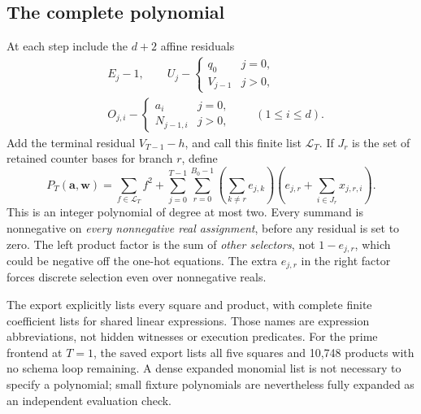 \documentclass[11pt,letterpaper]{article}
\theoremstyle{definition}
\theoremstyle{remark}
\newcommand{\N}{\mathbb N}
\begin{document}
\subsection{The complete polynomial}
At each step include the $d+2$ affine residuals
\begin{align*}
 &E_j-1,\qquad U_j-\begin{cases}q_0&j=0,\\V_{j-1}&j>0,\end{cases}\\
 &O_{j,i}-\begin{cases}a_i&j=0,\\N_{j-1,i}&j>0,\end{cases}
 \qquad (1\leq i\leq d).
\end{align*}
Add the terminal residual $V_{T-1}-h$, and call this finite list $\mathcal L_T$. If $J_r$ is the set of retained counter bases for branch $r$, define
\begin{equation}\label{qoc:um:eq:polynomial}
 P_T(\mathbf a,\mathbf w)=\sum_{f\in\mathcal L_T}f^2+
 \sum_{j=0}^{T-1}\sum_{r=0}^{B_0-1}
 \left(\sum_{k\ne r}e_{j,k}\right)
 \left(e_{j,r}+\sum_{i\in J_r}x_{j,r,i}\right).
\end{equation}
This is an integer polynomial of degree at most two. Every summand is nonnegative on \emph{every nonnegative real assignment}, before any residual is set to zero. The left product factor is the sum of \emph{other selectors}, not $1-e_{j,r}$, which could be negative off the one-hot equations. The extra $e_{j,r}$ in the right factor forces discrete selection even over nonnegative reals.

The export explicitly lists every square and product, with complete finite coefficient lists for shared linear expressions. Those names are expression abbreviations, not hidden witnesses or execution predicates. For the prime frontend at $T=1$, the saved export lists all five squares and 10,748 products with no schema loop remaining. A dense expanded monomial list is not necessary to specify a polynomial; small fixture polynomials are nevertheless fully expanded as an independent evaluation check.
\end{document}
